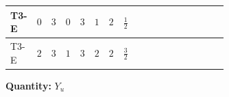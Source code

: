 \documentclass[8pt]{article}
\begin{document}
\begin{landscape}
\begin{longtable}{@{}llcccccc >{\raggedright\arraybackslash}p{0.21\linewidth} >{\raggedright\arraybackslash}p{0.21\linewidth} >{\raggedright\arraybackslash}p{0.21\linewidth}@{}}
T3-E & $0$ & $3$ & $0$ & $3$ & $1$ & $2$ & $\frac{1}{2}$ & \scriptsize\adjustbox{max width=\linewidth}{$\begin{gathered} -\frac{3}{2} (\left({Y_d}\,\left({Y_d}\right)^{\dagger}\,{Y_u}\right)_{ij}-\left({Y_u}\,\left({Y_u}\right)^{\dagger}\,{Y_u}\right)_{ij})\end{gathered}$} & \scriptsize\adjustbox{max width=\linewidth}{$\begin{gathered} -\frac{9}{4} {g_2}^2 \left({Y_u}\right)_{ij}\end{gathered}$} & \scriptsize\adjustbox{max width=\linewidth}{$\begin{gathered} -8 {g_3}^2 \left({Y_u}\right)_{ij}\end{gathered}$} \\
\midrule
T3-E & $2$ & $3$ & $1$ & $3$ & $2$ & $2$ & $\frac{3}{2}$ & \scriptsize\adjustbox{max width=\linewidth}{$\begin{gathered} -\frac{3}{2} (\left({Y_d}\,\left({Y_d}\right)^{\dagger}\,{Y_u}\right)_{ij}-\left({Y_u}\,\left({Y_u}\right)^{\dagger}\,{Y_u}\right)_{ij})\end{gathered}$} & \scriptsize\adjustbox{max width=\linewidth}{$\begin{gathered} -\frac{9}{4} {g_2}^2 \left({Y_u}\right)_{ij}\end{gathered}$} & \scriptsize\adjustbox{max width=\linewidth}{$\begin{gathered} -8 {g_3}^2 \left({Y_u}\right)_{ij}\end{gathered}$} \\
\midrule
\bottomrule
\end{longtable}
\clearpage
\noindent\textbf{Quantity: }$Y_u$\par\smallskip

\end{landscape}
\end{document}

